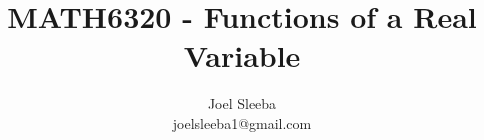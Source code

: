 \documentclass[12pt]{report}
\theoremstyle{plain} %
\theoremstyle{definition} %
\theoremstyle{remark} %
\begin{document}
\title{MATH6320 - Functions of a Real Variable}


\author{
  Joel Sleeba \\
  joelsleeba1@gmail.com \\
}

\maketitle

 \setcounter{page}{2}
\tableofcontents
{} \setcounter{page}{1}
























\printbibliography[heading=bibintoc]
\end{document}
